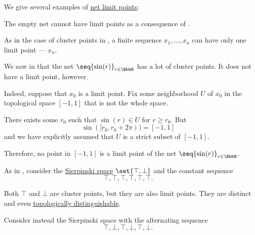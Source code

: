 \begin{example}\label{ex:def:net_limit_point}
  We give several examples of \hyperref[def:net_limit_point]{net limit points}:

  \begin{thmenum}
     The empty net cannot have limit points as a consequence of .

     As in the case of cluster points in , a finite sequence \( x_1, \ldots, x_n \) can have only one limit point --- \( x_n \).

     We saw in  that the net \( \seq{ \sin(r) }_{r \in \BbbR} \) has a lot of cluster points. It does not have a limit point, however.

    Indeed, suppose that \( x_0 \) is a limit point. Fix some neighborhood \( U \) of \( x_0 \) in the topological space \( [-1, 1] \) that is not the whole space.

    There exists some \( r_0 \) such that \( \sin(r) \in U \) for \( r \geq r_0 \). But
    \begin{equation*}
      \sin([r_0, r_0 + 2\pi)) = [-1, 1]
    \end{equation*}
    and we have explicitly assumed that \( U \) is a strict subset of \( [-1, 1] \).

    Therefore, no point in \( [-1, 1] \) is a limit point of the net \( \seq{ \sin(r) }_{r \in \BbbR} \).

     As in , consider the \hyperref[def:sierpinski_space]{Sierpinski space} \( \set{ \top, \bot } \) and the constant sequence
    \begin{equation*}
      \top, \top, \top, \top, \top, \top.
    \end{equation*}

    Both \( \top \) and \( \bot \) are cluster points, but they are also limit points. They are distinct and even \hyperref[def:topologically_indistinguishable]{topologically distinguishable}.

     Consider instead the Sierpinski space with the alternating sequence
    \begin{equation*}
      \top, \bot, \top, \bot, \top, \bot.
    \end{equation*}


\end{thmenum}
\end{example}
